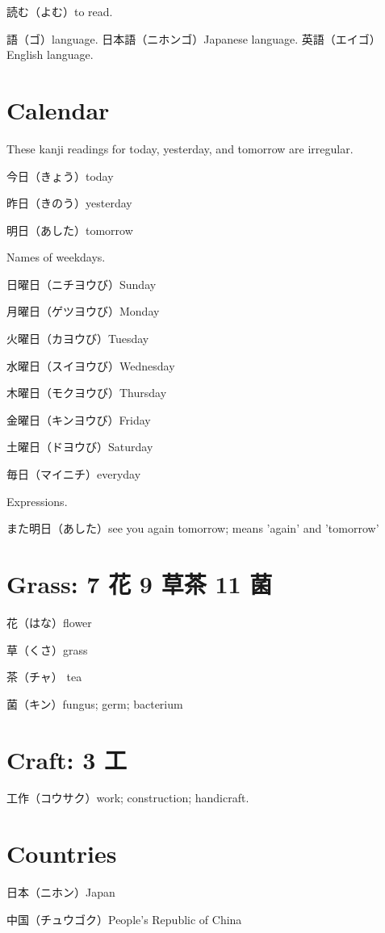 読む（よむ）to read.

語（ゴ）language.
日本語（ニホンゴ）Japanese language.
英語（エイゴ）English language.

\section{Calendar}

These kanji readings for today, yesterday, and tomorrow are irregular.

今日（きょう）today

昨日（きのう）yesterday

明日（あした）tomorrow

Names of weekdays.

日曜日（ニチヨウび）Sunday

月曜日（ゲツヨウび）Monday

火曜日（カヨウび）Tuesday

水曜日（スイヨウび）Wednesday

木曜日（モクヨウび）Thursday

金曜日（キンヨウび）Friday

土曜日（ドヨウび）Saturday

毎日（マイニチ）everyday

Expressions.

また明日（あした）see you again tomorrow; means 'again' and 'tomorrow'

\section{Grass: 7 花 9 草茶 11 菌}

花（はな）flower

草（くさ）grass

茶（チャ） tea

菌（キン）fungus; germ; bacterium

\section{Craft: 3 工}

工作（コウサク）work; construction; handicraft.

\section{Countries}

日本（ニホン）Japan

中国（チュウゴク）People's Republic of China

